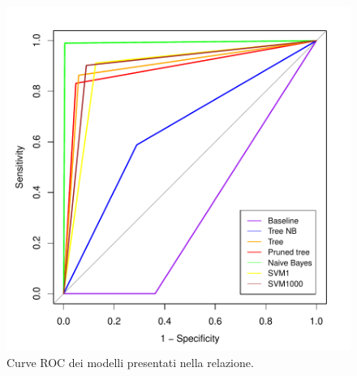 \begin{figure}
	\centering
	\includegraphics[width=0.9\linewidth]{../FinalResults/Images/Mixed2}
	\caption{Curve ROC dei modelli presentati nella relazione.}
	\label{fig:mixed2}
\end{figure}
